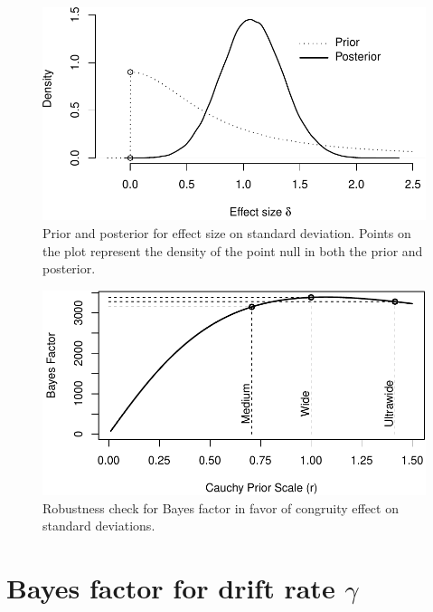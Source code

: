 \documentclass[english,floatsintext,doc]{apa6}
\theoremstyle{definition}
\theoremstyle{definition}
\theoremstyle{definition}
\theoremstyle{remark}
\begin{document}
\begin{figure}
\centering
\includegraphics{supplement_files/figure-latex/sdPosterior-1.pdf}
\caption{\label{fig:sdPosterior}Prior and posterior for effect size on
standard deviation. Points on the plot represent the density of the
point null in both the prior and posterior.}
\end{figure}

\begin{figure}
\centering
\includegraphics{supplement_files/figure-latex/sdRobustness-1.pdf}
\caption{\label{fig:sdRobustness}Robustness check for Bayes factor in favor
of congruity effect on standard deviations.}
\end{figure}

\section{\texorpdfstring{Bayes factor for drift rate
\(\gamma\)}{Bayes factor for drift rate \textbackslash{}gamma}}\label{bayes-factor-for-drift-rate-gamma}
\end{document}
